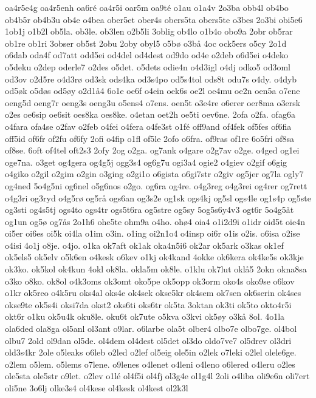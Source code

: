 {oa4r5e4g
oa4r5enh
oa6r^^e9
oa4r5i
oar5m
oa9t^^e9
o1au
o1a4v
2o3ba
obb4l
ob4bo
ob4b5r
ob4b3u
ob4e
o4bea
ober5et
ober4s
obers5ta
obers5te
o3bes
2o3bi
obi5e6
1ob1j
o1b2l
ob5la.
ob3le.
ob3len
o2b5li
3oblig
ob4lo
o1b4o
obo9a
2obr
ob5rar
ob1re
ob1ri
3obser
ob5st
2obu
2oby
obyl5
o5b^^f8
o3b^^e5
4oc
ock5ers
o5cy
2o1d
o6dab
oda4f
od7att
odd5ei
od4del
od4dest
od9do
od4e
o2deb
o6d5ei
o4deko
o5deku
o2dep
oderle7
o2des
o5det.
o5dets
odie4n
o4d3igl
o4dj
odko5
od3oml
od3ov
o2d5re
o4d3r^^f8
od3sk
ods4ka
od3s4po
od5s4tol
ods8t
odu7s
o4dy.
o4dyb
od5^^f8k
o5d^^f8s
od5^^f8y
o2d1^^e54
6o1e
oe6f
o4ein
oek6s
oe2l
oe4mu
oe2n
oen5a
o7ene
oeng5d
oeng7r
oeng3s
oeng3u
o5ens4
o7ens.
oen5t
o3e4re
o6erer
oer8ma
o3ersk
o2es
oe6sip
oe6sit
oes8ka
oes8ke.
o4etan
oet2h
oe5ti
oev6ne.
2ofa
o2fa.
ofag6a
o4fara
ofa4se
o2fav
o2feb
o4fei
o4fera
o4fe3st
o1f^^e9
off9and
of4fek
of5fes
of6fia
off5id
of6fr
of2fu
of6fy
2ofi
o4fip
o1fl
of5le
2ofo
o6fra.
of9ras
of1re
6o5fri
of8sa
of8se.
6oft
of4tel
oft2s3
2ofy
2og
o2ga.
og7ank
o4gare
o2g7av
o2ge.
o4ged
og1ei
oge7na.
o3get
og4gera
og4g5j
ogg3s4
og6g7u
ogi3a4
ogie2
o4giev
o2gif
o6gig
o4giko
o2gil
o2gim
o2gin
o3ging
o2gi1o
o6gista
o6gi7str
o2giv
og5jer
og7la
ogly7
og4ned
5o4g5ni
og6nel
o5g6nos
o2go.
og6ra
og4re.
o4g3reg
o4g3rei
og4rer
og7rett
o4g3ri
og3ryd
o4g5r^^f8
og5r^^e5
ogs6an
og3s2e
og1sk
ogs4kj
og5sl
ogs4le
og1s4p
og5ste
og3sti
og4s5tj
ogs4to
ogs4tr
ogs5t6ra
og5stre
og5sy
5og5s6y4v3
ogt6r
5o4g5^^e5t
og1un
og5^^f8
og7^^e5s
2o1h6
ohe5te
ohm9a
o4ho.
oh^^f84
oia4
o1i2d9i
o1idr
oid5t
oie4n
oi5er
oi6es
oi5k
oi4la
o1im
o3in.
o1ing
oi2n1o4
o4insp
oi6r
o1is
o2is.
o6isa
o2ise
o4isi
4o1j
o8je.
o4jo.
o1ka
ok7aft
ok1ak
oka4n5i6
ok2ar
ok5ark
o3kas
ok1ef
ok5els5
ok5elv
o5k6en
o4kesk
o6kev
o1kj
ok4kand
4okke
ok6kera
ok4ke5s
ok3kje
ok3ko.
ok5kol
ok4kun
4okl
ok8la.
okla5m
ok8le.
o1klu
ok7lut
okl^^e55
2okn
okna8sa
o3ko
o8ko.
ok8ol
o4k3oms
ok3omt
oko5pe
ok5opp
ok3orm
oko4s
oko9se
o6kov
o1kr
ok5reo
o4k5ru
oks4al
oks4e
ok4sek
okse5kr
ok4sem
ok7sen
ok6serin
ok4ses
okse9te
ok5s4i
oksi7da
okst2
oks6ti
oks6tr
ok5ta
3oktan
ok3ti
ok5to
okto4r5i
okt6r
o1ku
ok5u4k
oku8le.
oku6t
ok7ute
o5kva
o3kvi
ok5^^f8y
o3k^^e5
8ol.
4o1la
ola6ded
ola8ga
ol5anl
ol3ant
o9lar.
o6larbe
ola5t
olber4
olbo7e
olbo7ge.
ol4bol
olbu7
2old
ol9dan
ol5de.
ol4dem
ol4dest
ol5det
ol3do
oldo7ve7
ol5drev
ol3dri
old3s4kr
2ole
o5leaks
o6leb
o2led
o2lef
ol5eig
ole5in
o2lek
o7leki
o2lel
olele6ge.
o2lem
o5lem.
o5lems
o7lene.
o9lenes
o4lenet
o4leni
o4leno
o6lered
o4leru
o2les
ole5sta
ole5str
o9let.
o2lev
o1l^^e9
ol4f5i
ol4fj
ol3g4e
ol1g4l
2oli
o4liba
oli9e6n
oli7ert
oli5ne
3o6lj
olke3s4
ol4kese
ol4kesk
ol4kest
ol2k3l
}
